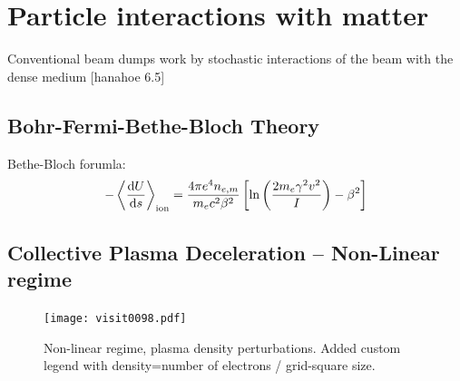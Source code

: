 \clearpage
\section{Particle interactions with matter}
Conventional beam dumps work by stochastic interactions of the beam with the dense medium [hanahoe 6.5]
\subsection{Bohr-Fermi-Bethe-Bloch Theory}
Bethe-Bloch forumla:
\begin{equation}
-\expval{\frac{\mathrm{d}U}{\mathrm{d}s}}_{\text{ion}}=\frac{4\pi e^4n_{e,m}}{m_ec^2\beta^2}\left[\ln\left(\frac{2m_e\gamma^2v^2}{I}\right) -\beta^2\right]
\end{equation}

\subsection{Collective Plasma Deceleration -- Non-Linear regime }
\clearpage
\begin{figure}
\centering
\texttt{[image: visit0098.pdf]}
\caption{Non-linear regime, plasma density perturbations. Added custom legend with density=number of electrons / grid-square size. }
\end{figure}

